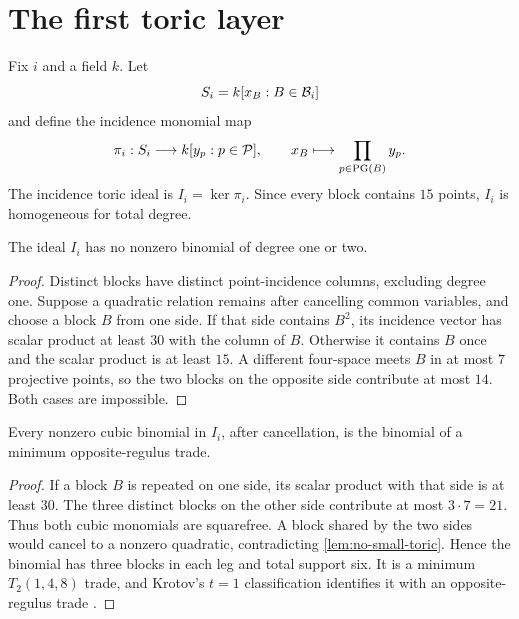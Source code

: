 \section{The first toric layer}
\label{sec:toric}

Fix \(i\) and a field \(k\).  Let
\[
 S_i=k[x_B:B\in\mathcal B_i]
\]
and define the incidence monomial map
\[
 \pi_i:S_i\longrightarrow k[y_p:p\in\mathcal P],
 \qquad
 x_B\longmapsto\prod_{p\in\operatorname{PG}(B)}y_p.
\]
The incidence toric ideal is \(I_i=\ker\pi_i\).  Since every block
contains \(15\) points, \(I_i\) is homogeneous for total degree.

\begin{lemma}
\label{lem:no-small-toric}
The ideal \(I_i\) has no nonzero binomial of degree one or two.
\end{lemma}

\begin{proof}
Distinct blocks have distinct point-incidence columns, excluding degree
one.  Suppose a quadratic relation remains after cancelling common
variables, and choose a block \(B\) from one side.  If that side contains
\(B^2\), its incidence vector has scalar product at least \(30\) with
the column of \(B\).  Otherwise it contains \(B\) once and the scalar
product is at least \(15\).  A different four-space meets \(B\) in at
most \(7\) projective points, so the two blocks on the opposite side
contribute at most \(14\).  Both cases are impossible.
\end{proof}

\begin{lemma}
\label{lem:cubic-classification}
Every nonzero cubic binomial in \(I_i\), after cancellation, is the
binomial of a minimum opposite-regulus trade.
\end{lemma}

\begin{proof}
If a block \(B\) is repeated on one side, its scalar product with that
side is at least \(30\).  The three distinct blocks on the other side
contribute at most \(3\cdot7=21\).  Thus both cubic monomials are
squarefree.  A block shared by the two sides would cancel to a nonzero
quadratic, contradicting \cref{lem:no-small-toric}.  Hence the binomial
has three blocks in each leg and total support six.  It is a minimum
\(T_2(1,4,8)\) trade, and Krotov's \(t=1\) classification identifies it
with an opposite-regulus trade \cite{Krotov2017}.
\end{proof}

